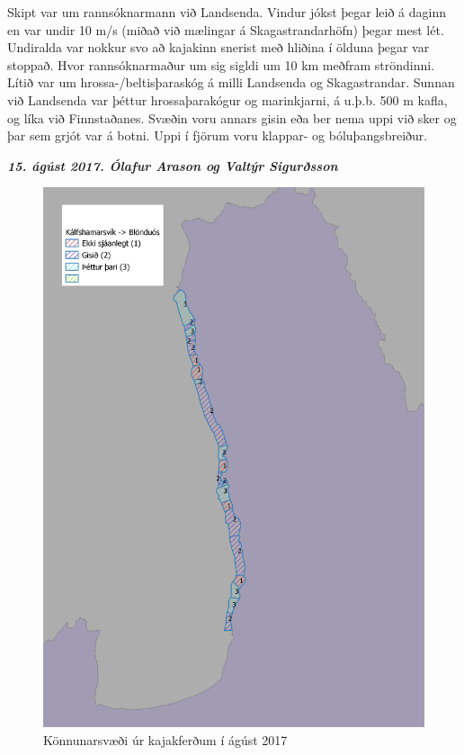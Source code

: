 \documentclass[icelandic,]{book}
\begin{document}
Skipt var um rannsóknarmann við Landsenda. Vindur jókst þegar leið á daginn en var undir 10 m/s (miðað við mælingar á Skagastrandarhöfn) þegar mest lét. Undiralda var nokkur svo að kajakinn snerist með hliðina í ölduna þegar var stoppað. Hvor rannsóknarmaður um sig sigldi um 10 km meðfram ströndinni. Lítið var um hrossa-/beltisþaraskóg á milli Landsenda og Skagastrandar. Sunnan við Landsenda var þéttur hrossaþarakógur og marinkjarni, á u.þ.b. 500 m kafla, og líka við Finnstaðanes. Svæðin voru annars gisin eða ber nema uppi við sker og þar sem grjót var á botni. Uppi í fjörum voru klappar- og bóluþangsbreiður.

\textbf{\emph{15. ágúst 2017. Ólafur Arason og Valtýr Sigurðsson}}

\begin{figure}

{\centering \includegraphics[width=1\linewidth]{myndir/feltkort/konnun} 

}

\caption{Könnunarsvæði úr kajakferðum í ágúst 2017}\label{fig:kort1}
\end{figure}
\end{document}
